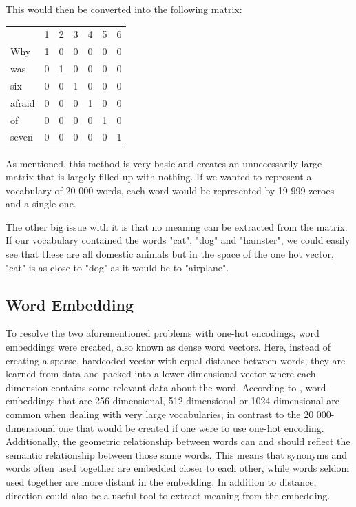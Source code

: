 \documentclass[nofilelist]{cslthse-msc}
\begin{document}
This would then be converted into the following matrix:

\begin{center}
    \begin{tabular}{lllllll}
                            & 1 & 2 & 3 & 4 & 5 & 6 \\ \cline{2-7} 
\multicolumn{1}{l|}{Why}    & 1 & 0 & 0 & 0 & 0 & 0 \\
\multicolumn{1}{l|}{was}    & 0 & 1 & 0 & 0 & 0 & 0 \\
\multicolumn{1}{l|}{six}    & 0 & 0 & 1 & 0 & 0 & 0 \\
\multicolumn{1}{l|}{afraid} & 0 & 0 & 0 & 1 & 0 & 0 \\
\multicolumn{1}{l|}{of}     & 0 & 0 & 0 & 0 & 1 & 0 \\
\multicolumn{1}{l|}{seven}  & 0 & 0 & 0 & 0 & 0 & 1
    \end{tabular}
\end{center}

As mentioned, this method is very basic and creates an unnecessarily large matrix that is largely filled up with nothing. If we wanted to represent a vocabulary of 20 000 words, each word would be represented by 19 999 zeroes and a single one. 

The other big issue with it is that no meaning can be extracted from the matrix. If our vocabulary contained the words "cat", "dog" and "hamster", we could easily see that these are all domestic animals but in the space of the one hot vector, "cat" is as close to "dog" as it would be to "airplane". 

\subsection{Word Embedding}
To resolve the two aforementioned problems with one-hot encodings, word embeddings were created, also known as dense word vectors. \citep{neuralnetworkmethods} 
Here, instead of creating a sparse, hardcoded vector with equal distance between words, they are learned from data and packed into a lower-dimensional vector where each dimension contains some relevant data about the word. According to \citet{franoischollet2017learning}, word embeddings that are 256-dimensional, 512-dimensional or 1024-dimensional are common when dealing with very large vocabularies, in contrast to the 20 000-dimensional one that would be created if one were to use one-hot encoding. Additionally, the geometric relationship between words can and should reflect the semantic relationship between those same words. This means that synonyms and words often used together are embedded closer to each other, while words seldom used together are more distant in the embedding. In addition to distance, direction could also be a useful tool to extract meaning from the embedding. %
\end{document}
